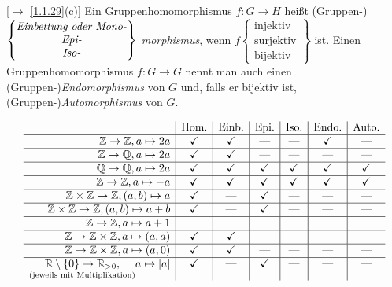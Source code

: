 \documentclass[../../main.tex]{subfiles}
\begin{document}
\begin{nt}\label{2.2.12}[$\to$ \ref{1.1.29}(c)]
Ein Gruppenhomomorphismus $f:G\rightarrow H$ heißt
(Gruppen-)$\begin{Bmatrix}\text{\emph{Einbettung oder Mono-}}\\\text{\emph{Epi-}}\\\text{\emph{Iso-}}\end{Bmatrix}$ \emph{morphismus}, wenn $f\begin{Bmatrix}\text{injektiv}\\\text{surjektiv}\\\text{bijektiv}\end{Bmatrix}$ ist.
Einen Gruppenhomomorphismus $f:G\rightarrow G$ nennt man auch einen (Gruppen-)\emph{Endomorphismus} von $G$ und, falls er bijektiv ist,
(Gruppen-)\emph{Automorphismus} von $G$.
\end{nt}

\begin{bsp}\label{2.2.13}
\[
\begin{array}{r|c|c|c|c|c|c}
 &\text{Hom.}&\text{Einb.}&\text{Epi.}&\text{Iso.}&\text{Endo.}&\text{Auto.}\\\hline
 \mathbb Z\rightarrow\mathbb Z, a\mapsto 2a & \checkmark & \checkmark & \text{---} & \text{---} & \checkmark & \text{---} \\\hline
 \mathbb Z\rightarrow\mathbb Q, a\mapsto 2a & \checkmark & \checkmark & \text{---} & \text{---} & \text{---} & \text{---} \\\hline
 \mathbb Q\rightarrow \mathbb Q, a\mapsto 2a & \checkmark & \checkmark & \checkmark & \checkmark & \checkmark & \checkmark \\\hline
 \mathbb Z\rightarrow \mathbb Z, a\mapsto-a & \checkmark & \checkmark & \checkmark & \checkmark & \checkmark & \checkmark \\\hline
 \mathbb Z\times\mathbb Z\rightarrow \mathbb Z, (a,b)\mapsto a & \checkmark & \text{---} & \checkmark & \text{---} & \text{---} & \text{---} \\\hline
  \mathbb Z\times\mathbb Z\rightarrow \mathbb Z, (a,b)\mapsto a+b& \checkmark & \text{---} & \checkmark & \text{---} & \text{---} & \text{---} \\\hline
\mathbb Z\rightarrow \mathbb Z, a\mapsto a+1 & \text{---} & \text{---} & \text{---} & \text{---} & \text{---} & \text{---} \\\hline
\mathbb Z\to\mathbb Z\times\mathbb Z, a\mapsto(a,a) & \checkmark & \checkmark &  \text{---} & \text{---} & \text{---} & \text{---}\\\hline
\mathbb Z\to\mathbb Z\times\mathbb Z, a\mapsto(a,0) & \checkmark & \checkmark &  \text{---} & \text{---} & \text{---} & \text{---}\\\hline
\underset{{\tiny\text{(jeweils mit Multiplikation)}} }{\mathbb R\setminus\left\{0\right\}\rightarrow \mathbb R_{>0},}a\mapsto |a|& \checkmark & \text{---} & \checkmark & \text{---} & \text{---} & \text{---}
\end{array}
\]
\end{bsp}
\end{document}
